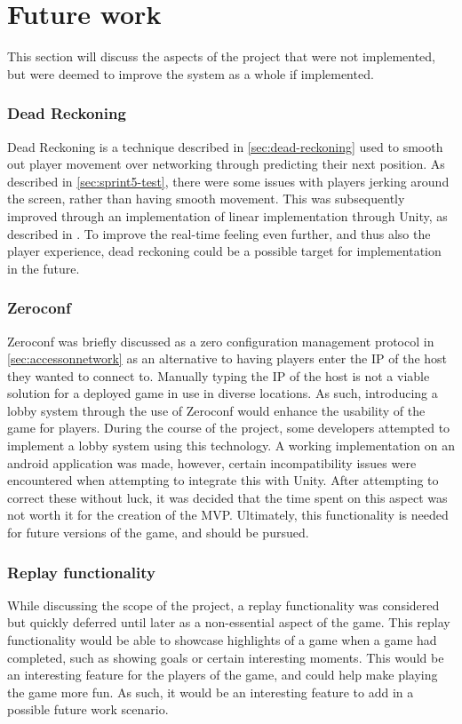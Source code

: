 \section{Future work}
This section will discuss the aspects of the project that were not implemented, but were deemed to improve the system as a whole if implemented.

\subsubsection{Dead Reckoning}
Dead Reckoning is a technique described in \autoref{sec:dead-reckoning} used to smooth out player movement over networking through predicting their next position.
As described in \autoref{sec:sprint5-test}, there were some issues with players jerking around the screen, rather than having smooth movement.
This was subsequently improved through an implementation of linear implementation through Unity, as described in .
To improve the real-time feeling even further, and thus also the player experience, dead reckoning could be a possible target for implementation in the future.

\subsubsection{Zeroconf}
Zeroconf was briefly discussed as a zero configuration management protocol in \autoref{sec:accessonnetwork} as an alternative to having players enter the IP of the host they wanted to connect to.
Manually typing the IP of the host is not a viable solution for a deployed game in use in diverse locations.
As such, introducing a lobby system through the use of Zeroconf would enhance the usability of the game for players.
During the course of the project, some developers attempted to implement a lobby system using this technology.
A working implementation on an android application was made, however, certain incompatibility issues were encountered when attempting to integrate this with Unity.
After attempting to correct these without luck, it was decided that the time spent on this aspect was not worth it for the creation of the MVP.
Ultimately, this functionality is needed for future versions of the game, and should be pursued.

\subsubsection{Replay functionality}
While discussing the scope of the project, a replay functionality was considered but quickly deferred until later as a non-essential aspect of the game.
This replay functionality would be able to showcase highlights of a game when a game had completed, such as showing goals or certain interesting moments.
This would be an interesting feature for the players of the game, and could help make playing the game more fun.
As such, it would be an interesting feature to add in a possible future work scenario.

